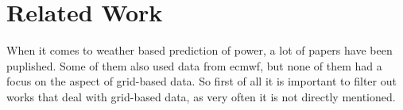 \chapter{Related Work}
\label{ch:RW}




When it comes to weather based prediction of power, a lot of papers have been puplished. Some of them also used data from \acrshort{ecmwf}, but none of them had a focus on the aspect of grid-based data. So first of all it is important to filter out works that deal with grid-based data, as very often it is not directly mentioned.\\


